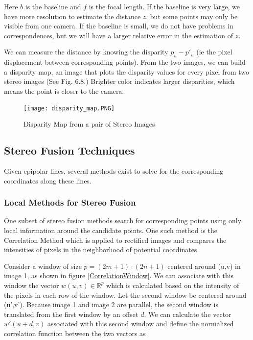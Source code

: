 \documentclass[twoside]{article}
\begin{document}
Here $b$ is the baseline and $f$ is the focal length. If the baseline is very large, we have more resolution to estimate the distance $z$, but some points may only be visible from one camera. If the baseline is small, we do not have problems in correspondences, but we will have a larger relative error in the estimation of $z$.

We can measure the distance by knowing the disparity $p_u-p'_u$ (ie the pixel displacement between corresponding points). From the two images, we can build a disparity map, an image that plots the disparity values for every pixel from two stereo images (See Fig. 6.8.) Brighter color indicates larger disparities, which means the point is closer to the camera.

\begin{figure}[h!]
  \begin{center}
	\texttt{[image: disparity\_map.PNG]}  \end{center}
  \caption{Disparity Map from a pair of Stereo Images}
  \label{ex}
\end{figure}


\subsection{Stereo Fusion Techniques}
Given epipolar lines, several methods exist to solve for the corresponding coordinates along these lines.  

\subsubsection{Local Methods for Stereo Fusion}
One subset of stereo fusion methods search for corresponding points using only local information around the candidate points. One such method is the Correlation Method which is applied to rectified images and compares the intensities of pixels in the neighborhood of potential coordinates. 

Consider a window of size $p = (2m+1)\cdot(2n+1)$ centered around (u,v) in image 1, as shown in figure \ref{CorrelationWindow}. We can associate with this window the vector $w(u,v) \in \mathbb{R}^{p}$ which is calculated based on the intensity of the pixels in each row of the window. Let the second window be centered around (u',v'). Because image 1 and image 2 are parallel, the second window is translated from the first window by an offset $d$. We can calculate the vector $w'(u+d,v)$ associated with this second window and define the normalized correlation function between the two vectors as
\end{document}
